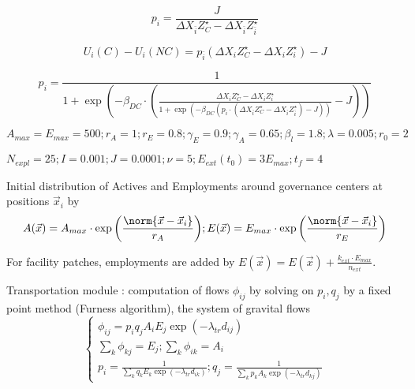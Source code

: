






\[
p_i = \frac{J}{\Delta X_{\bar{i}}{Z^{\star}_{C}} - \Delta X_{\bar{i}}{Z^{\star}_{\bar{i}}}}
\]



\[
U_i(C) - U_i(NC) = p_{\bar{i}} \left( \Delta X_{i}{Z^{\star}_{C}} - \Delta X_{i}{Z^{\star}_{i}}\right) - J
\]

\[
p_i = \frac{1}{1 + \exp{\left(-\beta_{DC}\cdot \left(\frac{\Delta X_{i}{Z^{\star}_{C}} - \Delta X_{i}{Z^{\star}_{i}}}{1 + \exp{\left(- \beta_{DC}(p_i \cdot (\Delta X_{\bar{i}}{Z^{\star}_{C}} - \Delta X_{\bar{i}}{Z^{\star}_{\bar{i}}}) - J)\right)}} - J \right)\right)}}
\]


\bigskip
\bigskip


$A_{max} = E_{max} = 500 ; r_A = 1 ; r_E = 0.8 ; \gamma_E = 0.9 ; \gamma_A = 0.65 ; \beta_{l} = 1.8 ; \lambda = 0.005 ; r_0 = 2$

$N_{expl} = 25 ; I = 0.001 ; J = 0.0001 ; \nu = 5 ; E_{ext}(t_0) = 3E_{max} ; t_f = 4$

\bigskip
\bigskip
\bigskip
\bigskip



Initial distribution of Actives and Employments around governance centers at positions $\vec{x}_i$ by
\[
A(\vec{x}) = A_{max} \cdot \exp{\left(\frac{\norm{\vec{x}-\vec{x}_i}}{r_A}\right)} ; 
E(\vec{x}) = E_{max} \cdot \exp{\left(\frac{\norm{\vec{x}-\vec{x}_i}}{r_E}\right)}
\]

\bigskip
\bigskip

For facility patches, employments are added by $E(\vec{x}) = E(\vec{x})+\frac{k_{ext}\cdot E_{max}}{n_{ext}}$.


\bigskip
\bigskip


Transportation module : computation of flows $\phi_{ij}$ by solving on $p_i,q_j$ by a fixed point method (Furness algorithm), the system of gravital flows
\[
\begin{cases}
\phi_{ij} = p_i q_j A_i E_j \exp{\left(-\lambda_{tr} d_{ij}\right)}\\
\sum_k \phi_{kj} = E_j ; \sum_k \phi_{ik} = A_i\\
p_i = \frac{1}{\sum_k{q_k E_k \exp{(-\lambda_{tr}d_{ik})}}} ; q_j = \frac{1}{\sum_k{p_k A_k \exp{(-\lambda_{tr}d_{kj})}}} 
\end{cases}
\]

